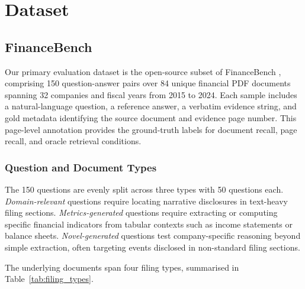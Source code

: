 \documentclass[12pt,twoside,maitrise]{dms}
\theoremstyle{definition}
\numberwithin{equation}{section}
\numberwithin{table}{chapter}
\numberwithin{figure}{chapter}
\begin{document}
\section{Dataset}
\label{sec:dataset}
\label{sec:pipeline}

\subsection{FinanceBench}
\label{sec:financebench_dataset}

Our primary evaluation dataset is the open-source subset of FinanceBench
\citep{islam2023financebench}, comprising 150 question-answer pairs over 84 unique
financial PDF documents spanning 32 companies and fiscal years from 2015 to 2024.
Each sample includes a natural-language question, a reference answer, a verbatim
evidence string, and gold metadata identifying the source document and evidence page
number. This page-level annotation provides the ground-truth labels for document
recall, page recall, and oracle retrieval conditions.

\subsubsection{Question and Document Types}
\label{sec:financebench_types}

The 150 questions are evenly split across three types with 50 questions each.
\emph{Domain-relevant} questions require locating narrative disclosures in text-heavy
filing sections.
\emph{Metrics-generated} questions require extracting or computing specific financial
indicators from tabular contexts such as income statements or balance sheets.
\emph{Novel-generated} questions test company-specific reasoning beyond simple
extraction, often targeting events disclosed in non-standard filing sections.

The underlying documents span four filing types, summarised in
Table~\ref{tab:filing_types}.
\end{document}

